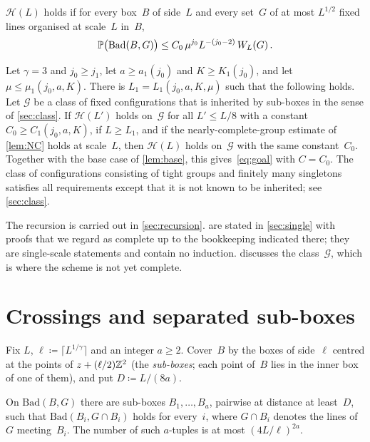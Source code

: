 \documentclass[11pt,letterpaper]{article}
\newcommand{\Bad}{\mathrm{Bad}}
\begin{document}
\begin{definition}
\label{def:H}
$\mathcal H(L)$ holds if for every box~$B$ of side~$L$ and every set~$G$ of at most $L^{1/2}$ fixed lines organised at scale~$L$ in~$B$,
\begin{equation}
\label{eq:H}
  \P\bigl(\Bad(B,G)\bigr)\le C_0\,\mu^{j_0}L^{-(j_0-2)}\,W_L(G)\,.
\end{equation}
\end{definition}

\begin{theorem}
\label{thm:main}
Let $\gamma=3$ and $j_0\ge j_1$, let $a\ge a_1(j_0)$ and $K\ge K_1(j_0)$, and let $\mu\le\mu_1(j_0,a,K)$. There is $L_1=L_1(j_0,a,K,\mu)$ such that the following holds. Let $\mathcal G$ be a class of fixed configurations that is inherited by sub-boxes in the sense of \cref{sec:class}. If $\mathcal H(L')$ holds on~$\mathcal G$ for all $L'\le L/8$ with a constant $C_0\ge C_1(j_0,a,K)$, if $L\ge L_1$, and if the nearly-complete-group estimate of \cref{lem:NC} holds at scale~$L$, then $\mathcal H(L)$ holds on~$\mathcal G$ with the same constant~$C_0$. Together with the base case of \cref{lem:base}, this gives~\eqref{eq:goal} with $C=C_0$. The class of configurations consisting of tight groups and finitely many singletons satisfies all requirements except that it is not known to be inherited; see \cref{sec:class}.
\end{theorem}

The recursion is carried out in \cref{sec:recursion}.  are stated in \cref{sec:single} with proofs that we regard as complete up to the bookkeeping indicated there; they are single-scale statements and contain no induction.  discusses the class~$\mathcal G$, which is where the scheme is not yet complete.

\section{Crossings and separated sub-boxes}
\label{sec:subboxes}

Fix $L$, $\ell\coloneqq\lceil L^{1/\gamma}\rceil$ and an integer $a\ge2$. Cover~$B$ by the boxes of side~$\ell$ centred at the points of $z+(\ell/2)\mathbb Z^2$ (the \emph{sub-boxes}; each point of~$B$ lies in the inner box of one of them), and put $D\coloneqq L/(8a)$.

\begin{lemma}
\label{lem:separated}
On $\Bad(B,G)$ there are sub-boxes $B_1,\dots,B_a$, pairwise at distance at least~$D$, such that $\Bad(B_i,G\cap B_i)$ holds for every~$i$, where $G\cap B_i$ denotes the lines of~$G$ meeting~$B_i$. The number of such $a$-tuples is at most $(4L/\ell)^{2a}$.
\end{lemma}
\end{document}
